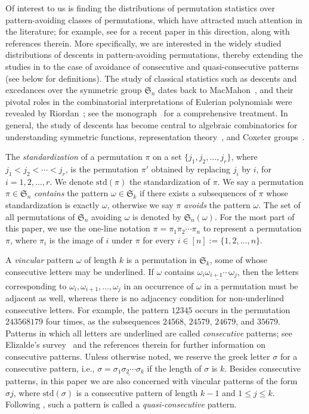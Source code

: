 \documentclass[11pt,reqno]{amsart}
\numberwithin{equation}{section}
\theoremstyle{plain}
\theoremstyle{definition}
\renewcommand{\S}{\mathfrak{S}}
\def\std{\mathrm{std}}
\begin{document}
Of interest to us is finding the distributions of permutation statistics over pattern-avoiding classes of permutations, which have attracted much attention in the literature; for example, see \cite{HK} for a recent paper in this direction, along with references therein. More specifically, we are interested in the widely studied distributions of descents in pattern-avoiding permutations, thereby extending the studies in \cite{BDGZ19, Bukata2019, HK, MR06} to the case of avoidance of consecutive and quasi-consecutive patterns (see below for definitions). The study of classical statistics such as descents and excedances over the symmetric group $\S_n$ dates back to MacMahon~\cite{mac60}, and their pivotal roles in the combinatorial interpretations of Eulerian polynomials were revealed by Riordan~\cite{rio58}; see the monograph~\cite{FS70} for a comprehensive treatment. In general, the study of descents has become central to algebraic combinatorics for understanding symmetric functions, representation theory~\cite{sag91}, and Coxeter groups~\cite{rei95}.

The \textit{standardization} of a permutation $\pi$ on a set $\{j_1,j_2,\ldots,j_r\}$, where
$j_1<j_2<\cdots<j_r$, is the permutation $\pi'$ obtained by replacing $j_i$ by $i$, for $i=1,2,\ldots,r$. We denote $\mathrm{std}(\pi)$ the standardization of $\pi$. We say a permutation $\pi \in \S_n$ \textit{contains} the pattern $\omega \in \S_k$ if there exists a subsequences of $\pi$ whose standardization is exactly $\omega$, otherwise we say $\pi$ \textit{avoids} the pattern $\omega$.
The set of all permutations of $\S_n$ avoiding $\omega$ is denoted by $\S_n(\omega)$. For the most part of this paper, we use the one-line notation $\pi=\pi_1\pi_2\cdots \pi_n$ to represent a permutation $\pi$, where $\pi_i$ is the image of $i$ under $\pi$ for every $i\in[n]:=\{1,2,\ldots,n\}$.

A \textit{vincular} pattern $\omega $ of length $k$ is a permutation in ${\S}_k$, some of whose consecutive letters may be underlined.
If $\omega $ contains $\underline{\omega_i\omega_{i+1}\cdots \omega_{j}}$, then the letters corresponding to $\omega_i,\omega _{i+1},\ldots,\omega_{j}$ 
in an occurrence of $\omega $ in a permutation must be adjacent as well, whereas there is no adjacency condition for non-underlined consecutive letters.
For example, the pattern $\underline{12}3\underline{45}$ occurs in the permutation $243568179$ four times,
as the subsequences $24568$, $24579$, $24679$, and $35679$.
Patterns in which all letters are underlined are called \textit{consecutive} patterns; see Elizalde's survey~\cite{eliz16} and the references therein for further information on consecutive patterns. Unless otherwise noted, we reserve the greek letter $\sigma$ for a consecutive pattern, 
i.e., $\sigma=\underline{\sigma_1\sigma_2\cdots\sigma_k}$ if the length of $\sigma$ is $k$. Besides consecutive patterns, in this paper we are also concerned with vincular patterns of the form $\sigma j$, where $\std(\sigma)$ is a consecutive pattern of length $k-1$ and $1\le j\le k$. Following \cite{CN18}, such a pattern is called a \textit{quasi-consecutive} pattern.
\end{document}
